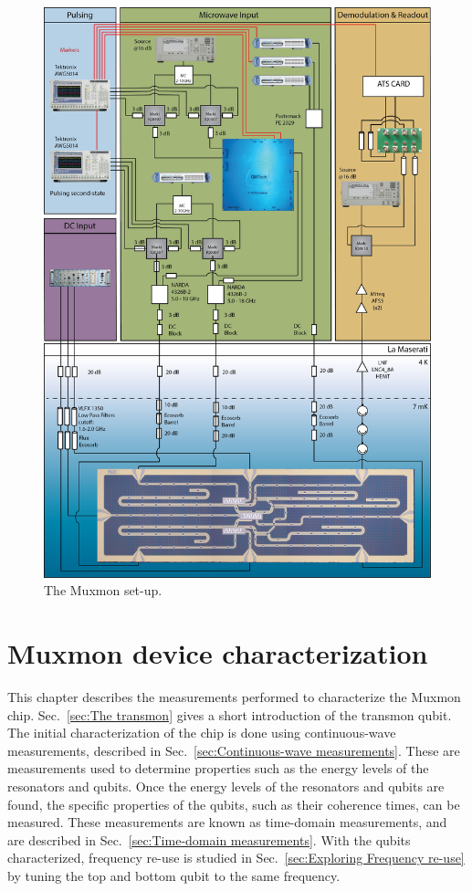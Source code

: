      \begin{figure}[tb]
        \centering
        \includegraphics[width=.9\textwidth]{Figures/20150512_Muxmon_Setup.jpg}
        \caption{The Muxmon set-up.}
        \label{fig:Muxmon set-up}
      \end{figure}
  \chapter{Muxmon device characterization}
    \label{ch:Muxmon device characterization}

    This chapter describes the measurements performed to characterize the Muxmon chip. Sec.~\ref{sec:The transmon} gives a short introduction of the transmon qubit. The initial characterization of the chip is done using continuous-wave measurements, described in Sec.~\ref{sec:Continuous-wave measurements}. These are measurements used to determine properties such as the energy levels of the resonators and qubits. Once the energy levels of the resonators and qubits are found, the specific properties of the qubits, such as their coherence times, can be measured. These measurements are known as time-domain measurements, and are described in Sec.~\ref{sec:Time-domain measurements}. With the qubits characterized, frequency re-use is studied in Sec.~\ref{sec:Exploring Frequency re-use} by tuning the top and bottom qubit to the same frequency.


